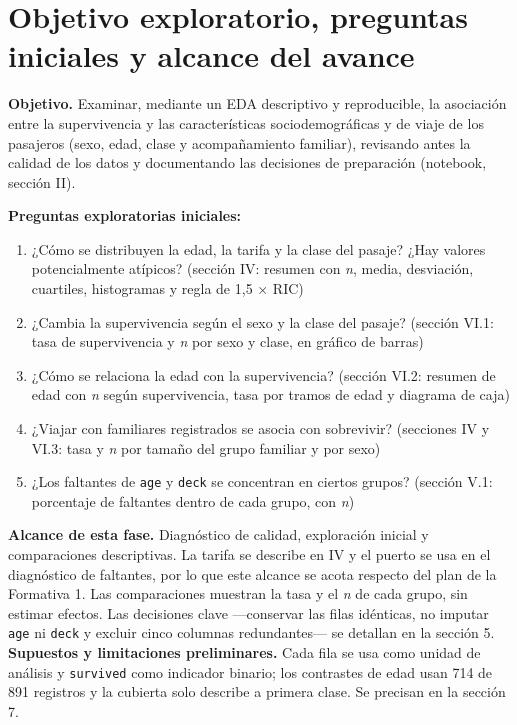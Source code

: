 \documentclass[11pt,letterpaper]{article}
\begin{document}
\section{Objetivo exploratorio, preguntas iniciales y alcance del avance}
\textbf{Objetivo.} Examinar, mediante un EDA descriptivo y reproducible, la asociación entre la supervivencia y las características sociodemográficas y de viaje de los pasajeros (sexo, edad, clase y acompañamiento familiar), revisando antes la calidad de los datos y documentando las decisiones de preparación (notebook, sección II).

\textbf{Preguntas exploratorias iniciales:}
\begin{enumerate}[nosep]
  \item ¿Cómo se distribuyen la edad, la tarifa y la clase del pasaje? ¿Hay valores potencialmente atípicos? (sección IV: resumen con \textit{n}, media, desviación, cuartiles, histogramas y regla de 1,5 × RIC)
  \item ¿Cambia la supervivencia según el sexo y la clase del pasaje? (sección VI.1: tasa de supervivencia y \textit{n} por sexo y clase, en gráfico de barras)
  \item ¿Cómo se relaciona la edad con la supervivencia? (sección VI.2: resumen de edad con \textit{n} según supervivencia, tasa por tramos de edad y diagrama de caja)
  \item ¿Viajar con familiares registrados se asocia con sobrevivir? (secciones IV y VI.3: tasa y \textit{n} por tamaño del grupo familiar y por sexo)
  \item ¿Los faltantes de \texttt{age} y \texttt{deck} se concentran en ciertos grupos? (sección V.1: porcentaje de faltantes dentro de cada grupo, con \textit{n})
\end{enumerate}

\textbf{Alcance de esta fase.} Diagnóstico de calidad, exploración inicial y comparaciones descriptivas. La tarifa se describe en IV y el puerto se usa en el diagnóstico de faltantes, por lo que este alcance se acota respecto del plan de la Formativa 1. Las comparaciones muestran la tasa y el \textit{n} de cada grupo, sin estimar efectos. Las decisiones clave ---conservar las filas idénticas, no imputar \texttt{age} ni \texttt{deck} y excluir cinco columnas redundantes--- se detallan en la sección 5. \textbf{Supuestos y limitaciones preliminares.} Cada fila se usa como unidad de análisis y \texttt{survived} como indicador binario; los contrastes de edad usan 714 de 891 registros y la cubierta solo describe a primera clase. Se precisan en la sección 7.
\end{document}
